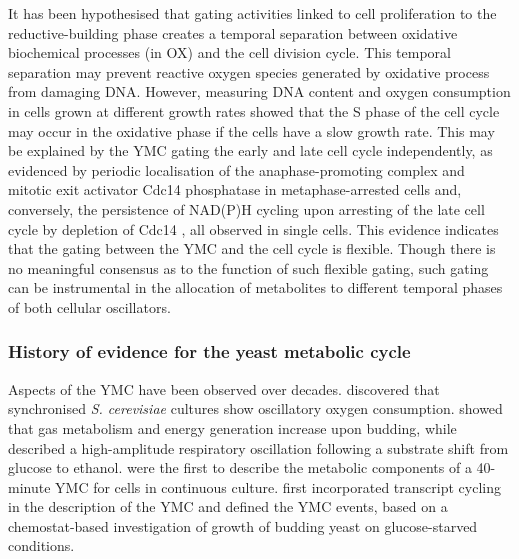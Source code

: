 It has been hypothesised that gating activities linked to cell proliferation to the reductive-building phase
creates a temporal separation between oxidative biochemical processes (in OX) and the cell division cycle.
This temporal separation may prevent reactive oxygen species generated by oxidative process from damaging DNA.
However, measuring DNA content and oxygen consumption in cells grown at different growth rates \parencite{slavovCouplingGrowthRate2011} showed that the S phase of the cell cycle may occur in the oxidative phase if the cells have a slow growth rate.
This may be explained by the YMC gating the early and late cell cycle independently, as evidenced by periodic localisation of the anaphase-promoting complex and mitotic exit activator Cdc14 phosphatase in metaphase-arrested cells \parencite{luPeriodicCyclinCdkActivity2010} and, conversely, the persistence of NAD(P)H cycling upon arresting of the late cell cycle by depletion of Cdc14 \parencite{papagiannakisAutonomousMetabolicOscillations2017}, all observed in single cells.
This evidence indicates that the gating between the YMC and the cell cycle is flexible.
Though there is no meaningful consensus as to the function of such flexible gating,
such gating can be instrumental in the allocation of metabolites to different temporal phases of both cellular oscillators.

\subsubsection{History of evidence for the yeast metabolic cycle}
\label{subsubsec:intro-ymc-definition-history}


Aspects of the YMC have been observed over decades.
\textcite{nosohSYNCHRONIZATIONBUDDINGCYCLE1962} discovered that synchronised \textit{S. cerevisiae} cultures show oscillatory oxygen consumption.
\textcite{kasparvonmeyenburgEnergeticsBuddingCycle1969} showed that gas metabolism and energy generation increase upon budding, while \textcite{mochanRespiratoryOscillationsAdapting1973} described a high-amplitude respiratory oscillation following a substrate shift from glucose to ethanol.
\textcite{satroutdinovOscillatoryMetabolismSaccharomyces1992} were the first to describe the metabolic components of a 40-minute YMC for cells in continuous culture.
\textcite{tuLogicYeastMetabolic2005}
first incorporated transcript cycling in the description of the YMC and defined the YMC events,
based on a chemostat-based investigation of growth of budding yeast on glucose-starved conditions.

